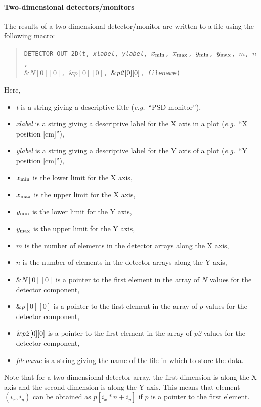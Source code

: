 \paragraph{Two-dimensional detectors/monitors}

The results of a two-dimensional detector/\discretionary{}{}{}mon\-i\-tor are written to a file using the
following macro:
\begin{quote}
  \texttt{DETECTOR\_OUT\_2D({\it t},
        {\it xlabel},
        {\it ylabel},
        $x_{\rm min}$, $x_{\rm max}$, $y_{\rm min}$, $y_{\rm max}$, $m$, $n$,\\
          $\&N[0][0]$, $\&p[0][0]$, $\&{\it p2}[0][0]$,
        {\it filename})}
\end{quote}
Here,
\begin{itemize}
\item \textit{t} is a string giving a descriptive title ({\em e.g.}\ ``PSD
  monitor''),
\item \textit{xlabel} is a string giving a descriptive label for the X
  axis in a plot ({\em e.g.}\ ``X position [cm]''),
\item \textit{ylabel} is a string giving a descriptive label for the Y
  axis of a plot ({\em e.g.}\ ``Y position [cm]''),
\item $x_{\rm min}$ is the lower limit for the X axis,
\item $x_{\rm max}$ is the upper limit for the X axis,
\item $y_{\rm min}$ is the lower limit for the Y axis,
\item $y_{\rm max}$ is the upper limit for the Y axis,
\item $m$ is the number of elements in the detector arrays along the X axis,
\item $n$ is the number of elements in the detector arrays along the Y axis,
\item $\&N[0][0]$ is a pointer to the first element in the array of $N$
  values for the detector component,
\item $\&p[0][0]$ is a pointer to the first element in the array of $p$
  values for the detector component,
\item $\&{\it p2}[0][0]$ is a pointer to the first element in the array of
  {\it p2} values for the detector component,
\item \textit{filename} is a string giving the name of the file in which
  to store the data.
\end{itemize}
Note that for a two-dimensional detector array, the first dimension is
along the X axis and the second dimension is along the Y axis. This
means that element $(i_x,i_y)$ can be obtained as $p[i_x*n+i_y]$ if $p$
is a pointer to the first element.

